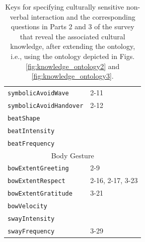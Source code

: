 \documentclass{CSSRforAfrica}
\begin{document}
\begin{table}[H]
\begin{center}
\begin{tabular}{|l l|}
{\footnotesize \verb+symbolicAvoidWave+} 	  & {\footnotesize 2-11 }\vspace{-1.01mm} \\
{\footnotesize \verb+symbolicAvoidHandover+} 	  & {\footnotesize 2-12  }\vspace{-1.01mm} \\
{\footnotesize \verb+beatShape+} 	                         & {\footnotesize \verb++}\vspace{-1.01mm} \\
{\footnotesize \verb+beatIntensity+} 	                 & {\footnotesize \verb++} \vspace{-1.01mm}\\
{\footnotesize \verb+beatFrequency+} 	                 & {\footnotesize \verb++} \\
\hline
\multicolumn{2}{|c|}{{\footnotesize Body Gesture}} \\
\hline
{\footnotesize \verb+bowExtentGreeting+} 	                        & {\footnotesize 2-9} \vspace{-1.01mm}\\
{\footnotesize \verb+bowExtentRespect+} 	                        & {\footnotesize 2-16, 2-17, 3-23} \vspace{-1.01mm}\\
{\footnotesize \verb+bowExtentGratitude+} 	                        & {\footnotesize  3-21} \vspace{-1.01mm}\\
{\footnotesize \verb+bowVelocity+}                       & {\footnotesize  } \vspace{-1.01mm}\\
{\footnotesize \verb+swayIntensity+} 	                & {\footnotesize  } \vspace{-1.01mm}\\
{\footnotesize \verb+swayFrequency+} 	                & {\footnotesize 3-29} \\
\hline \hline
\end{tabular}
\end{center}
\vspace{-6mm}
\caption{Keys for specifying culturally sensitive non-verbal interaction and the corresponding questions in Parts 2 and 3 of the survey that reveal the associated cultural knowledge, after extending the ontology, i.e., using the ontology depicted in Figs. \ref{fig:knowledge_ontology2} and \ref{fig:knowledge_ontology3}.}
\label{table:key-value_questions_nonverbal}
\end{table}
\end{document}

